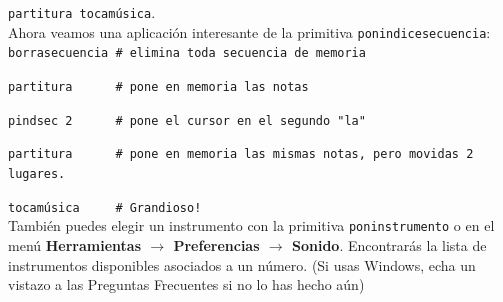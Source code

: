 \texttt{partitura tocam\'usica}. \\

\noindent Ahora veamos una aplicaci\'on interesante de la primitiva
\texttt{ponindicesecuencia}: \\

\verb+borrasecuencia # elimina toda secuencia de memoria+ 

\verb+partitura      # pone en memoria las notas+

\verb+pindsec 2      # pone el cursor en el segundo "la"+

\verb+partitura      # pone en memoria las mismas notas, pero movidas 2 lugares.+

\texttt{tocam\'usica}\verb+     # Grandioso!+ \\

\noindent Tambi\'en puedes elegir un instrumento con la primitiva
\texttt{poninstrumento} o en el men\'u \textbf{Herramientas $\rightarrow$
Preferencias $\rightarrow$ Sonido}. Encontrar\'as la lista de instrumentos
disponibles asociados a un n\'umero. (Si usas Windows, echa un vistazo a las
Preguntas Frecuentes si no lo has hecho a\'un) 